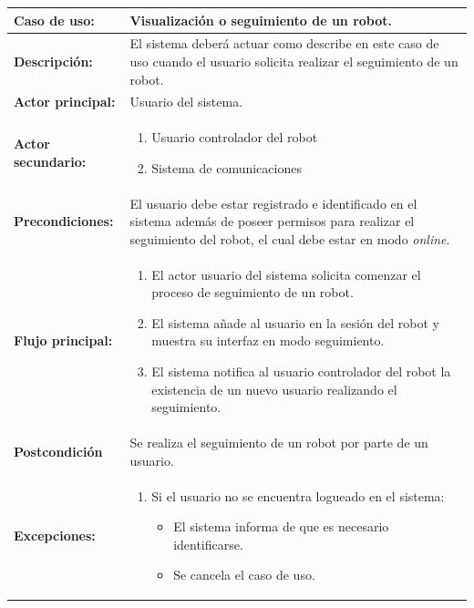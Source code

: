 \begin{table}[H]
  \begin{center}
    \begin{tabular}{|p{3.5cm}|p{10cm}|}
      \hline
      {\textbf{Caso de uso:}} & { Visualización o seguimiento de un robot.} \\
      \hline
      {\textbf{Descripción:}} & { El sistema deberá actuar como describe en este caso de uso cuando el usuario solicita realizar el seguimiento de un robot.} \\
     \hline
      {\textbf{Actor principal:}} & { Usuario del sistema.} \\
      \hline
      {\textbf{Actor secundario:}} & {     
	\begin{enumerate}
	\item Usuario controlador del robot
	\item Sistema de comunicaciones
	\end{enumerate}
      } \\
      \hline
      {\textbf{Precondiciones:}} & { El usuario debe estar registrado e identificado en el sistema además de poseer permisos para realizar el seguimiento del robot, el cual debe estar en modo \emph{online}.} \\
     \hline   
    {\textbf{Flujo principal:}} & { 
      \begin{enumerate}
	\item El actor usuario del sistema solicita comenzar el proceso de seguimiento de un robot.
	\item El sistema añade al usuario en la sesión del robot y muestra su interfaz en modo seguimiento.
	\item El sistema notifica al usuario controlador del robot la existencia de un nuevo usuario realizando el seguimiento.
      \end{enumerate}
      } \\
     \hline
     {\textbf{Postcondición}} & {Se realiza el seguimiento de un robot por parte de un usuario.}\\
     \hline
      {\textbf{Excepciones:}} & {
	\begin{enumerate}
	  \item Si el usuario no se encuentra logueado en el sistema:
	  \begin{itemize}
	    \item El sistema informa de que es necesario identificarse.
	    \item Se cancela el caso de uso.
	  \end{itemize}

\end{enumerate}}
\end{tabular}
\end{center}
\end{table}
